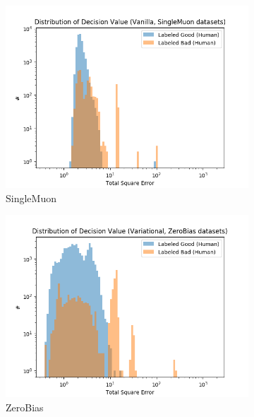 \begin{figure}[h!]
\centering
    \begin{subfigure}[b]{0.49\linewidth}
        \includegraphics[width=\linewidth]{images/reco/2018/feature_2/se_dist_Vanilla1f2_SingleMuon.png}
        \caption{SingleMuon}
    \end{subfigure}
    \begin{subfigure}[b]{0.49\linewidth}
        \includegraphics[width=\linewidth]{images/reco/2018/feature_2/se_dist_Variational1f2_ZeroBias.png}
        \caption{ZeroBias}
    \end{subfigure}
    \begin{subfigure}[b]{0.49\linewidth}

\end{subfigure}
\end{figure}
